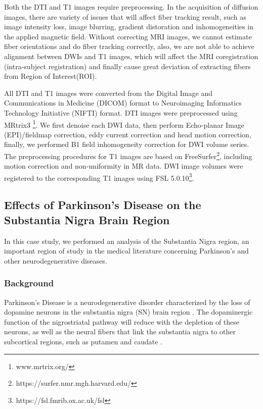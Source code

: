 Both the DTI and T1 images require preprocessing. In the acquisition of diffusion images, there are variety of issues that will affect fiber tracking result, such as image intensity loss, image blurring, gradient distoration and inhomogeneities in the applied magnetic field. Without correcting MRI images, we cannot estimate fiber orientations and do fiber tracking correctly, also, we are not able to achieve alignment between DWIs and T1 images, which will affect the MRI coregistration (intra-subject registration) and finally cause great deviation of extracting fibers from Region of Interest(ROI).

All DTI and T1 images were converted from the Digital Image and Communications in Medicine (DICOM) format to Neuroimaging Informatics Technology Initiative (NIFTI) format. DTI images were preprocessed using MRtrix3 \footnote{www.mrtrix.org/}. We first denoise each DWI data, then perform Echo-planar Image (EPI)/fieldmap correction, eddy current correction and head motion correction, finally, we performed B1 field inhomogeneity correction for DWI volume series. The preprocessing procedures for T1 images are based on FreeSurfer\footnote{https://surfer.nmr.mgh.harvard.edu/}, including motion correction and non-uniformity in MR data. DWI image volumes were registered to the corresponding T1 images using FSL 5.0.10\footnote{https://fsl.fmrib.ox.ac.uk/fsl}.

\subsection{Effects of Parkinson's Disease on the Substantia Nigra Brain Region}

In this case study, we performed an analysis of the Substantia Nigra region, an important region of study in the medical literature concerning Parkinson's and other neurodegenerative diseases.

\subsubsection{Background}

Parkinson's Disease is a neurodegenerative disorder characterized by the loss of dopamine neurons in the substantia nigra (SN) brain region \cite{prakash2012asymmetrical}. The dopaminergic function of the nigrostriatal pathway will reduce with the depletion of these neurons, as well as the neural fibers that link the substantia nigra to other subcortical regions, such as putamen and caudate \cite{zhang2015diffusion}.

